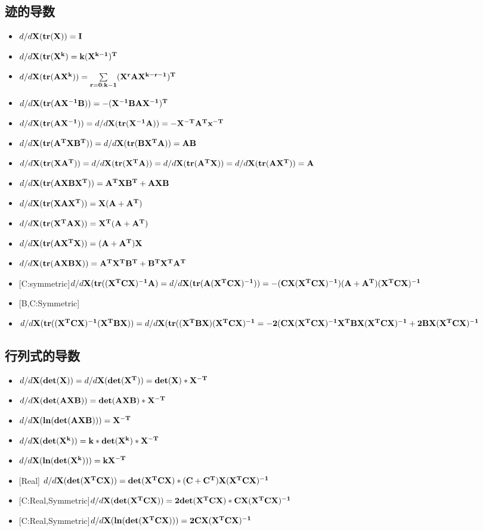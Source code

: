 \documentclass[fontset=none,oneside]{book}
\begin{document}
\subsection{迹的导数}
\begin{itemize}
\item $d/d{\bf X}\mathbf{(tr(X))=I}$
\item $d/d\bf X(tr\mathbf{(X^k)}=\mathbf{k(X^{k-1})^T}$
\item $d/d\bf
    X(tr\mathbf{(AX^{k})})=\mathbf{\sum\limits_{r=0:k-1}(X^{r}AX^{k-r-1})^{T}}$
\item $d/d\bf X(tr(AX^{-1}B))=-(X^{-1}BAX^{-1})^{T}$
\item $d/d{\bf X (tr(AX^{-1}))}=d/d{\bf X
    (tr(X^{-1}A))=-X^{-T}A^{T}x^{-T}}$
\item $d/d{\bf X(tr(A^{T}XB^{T}))}=d/d{\bf X(tr(BX^{T}A))=AB}$
\item $d/d{\bf X(tr(XA^{T}))}=d/d{\bf X(tr(X^{T}A))}=d/d{\bf
    X(tr(A^{T}X))}=d/d{\bf X(tr(AX^{T}))}={\bf A}$
\item $d/d{\bf X(tr(AXBX^{T}))=A^{T}XB^{T}+AXB}$
\item $d/d{\bf X(tr(XAX^{T}))=X(A+A^{T})}$
\item $d/d{\bf X(tr(X^{T}AX))=X^{T}(A+A^{T})}$
\item $d/d{\bf X(tr(AX^{T}X))=(A+A^{T})X}$
\item $d/d{\bf X(tr(AXBX))=A^{T}X^{T}B^{T}+B^{T}X^{T}A^{T}}$
\item {\color{red}[C:symmetric]}$d/d{\bf X(tr((X^{T}CX)^{-1}A)}=d/d{\bf
  X(tr(A(X^{T}CX)^{-1}))}=\bf
-(CX(X^{T}CX)^{-1})(A+A^{T})(X^{T}CX)^{-1}$
\item {\color{red}[B,C:Symmetric]}
\item $d/d{\bf
    X(tr((X^{T}CX)^{-1}(X^{T}BX))}=d/d{\bf
    X(tr((X^{T}BX)(X^{T}CX)^{-1}}={\bf -2(CX(X^{T}CX)^{-1}X^{T}BX(X^{T}CX)^{-1}+2BX(X^{T}CX)^{-1}}$
\end{itemize}
\subsection{行列式的导数}
\begin{itemize}
\item $d/d{\bf X(det(X))}=d/d{\bf X(det(X^{T}))}={\bf det(X)*X^{-T}}$
\item $d/d{\bf X(det(AXB))}={\bf det(AXB)*X^{-T}}$
\item $d/d{\bf X(ln(det(AXB)))}={\bf X^{-T}}$
\item $d/d{\bf X(det(X^{k}))=k*det(X^{k})*X^{-T}}$
\item $d/d{\bf X(ln(det(X^{k})))=kX^{-T}}$
\item {\color{red}[Real]} $d/d{\bf X(det(X^{T}CX))}={\bf
    det(X^{T}CX)*(C+C^{T})X(X^{T}CX)^{-1}}$
\item {\color{red} [C:Real,Symmetric]}$d/d{\bf
    X(det(X^{T}CX))=2det(X^{T}CX)*CX(X^{T}CX)^{-1}}$
\item {\color{red}[C:Real,Symmetric]}$d/d{\bf X(ln(det(X^{T}CX)))=2CX(X^{T}CX)^{-1}}$
\end{itemize}
\end{document}

